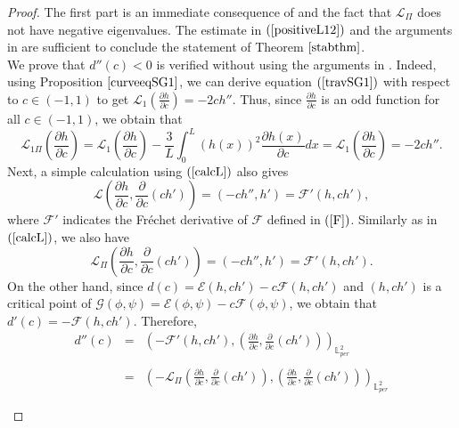 \documentclass[12pt,reqno,a4paper]{amsart} %
\numberwithin{equation}{section}
\numberwithin{figure}{section}
\begin{document}
\begin{proof} 
	
	
	The first part is an immediate consequence of \cite[page 278]{kato} and the fact that $\mathcal{L}_{\Pi}$ does not have negative eigenvalues. The estimate in $(\ref{positiveL12})$ and the arguments in \cite[Section 4]{Natali2015} are sufficient to conclude the statement of Theorem $\ref{stabthm}$.\\
	\indent  We prove that $d''(c)<0$ is verified without using the arguments in \cite[Subsection 4.2]{loreno}. Indeed, using Proposition $\ref{curveeqSG1}$, we can derive equation $(\ref{travSG1})$ with respect to $c\in(-1,1)$ to get $\mathcal{L}_1\left(\frac{\partial h}{\partial c}\right)=-2ch''$. Thus, since $\frac{\partial h}{\partial c}$ is an odd function for all $c\in(-1,1)$, we obtain that 
\begin{equation}\label{calcL}\mathcal{L}_{1\Pi}\left(\frac{\partial h}{\partial c}\right)=\mathcal{L}_1\left(\frac{\partial h}{\partial c}\right)-\frac{3}{L}\int_0^L(h(x))^2\frac{\partial h(x)}{\partial c}dx=
\mathcal{L}_1\left(\frac{\partial h}{\partial c}\right)=-2ch''.
\end{equation}
\indent Next, a simple calculation using $(\ref{calcL})$ also gives
\begin{equation}\label{calcL1}
\mathcal{L}\left(\frac{\partial h}{\partial c},\frac{\partial}{\partial c}(ch')\right)
=(-ch'',h')=\mathcal{F}'(h,ch'),
\end{equation}
where $\mathcal{F}'$ indicates the Fr\'echet derivative of $\mathcal{F}$ defined in $(\ref{F})$. Similarly as in $(\ref{calcL})$, we also have 
\begin{equation}\label{calcL2}
\mathcal{L}_{\Pi}\left(\frac{\partial h}{\partial c},\frac{\partial}{\partial c}(ch')\right)
=(-ch'',h')=\mathcal{F}'(h,ch').
\end{equation}
\indent On the other hand, since $d(c)=\mathcal{E}(h,ch')-c\mathcal{F}(h,ch')$ and $(h,ch')$ is a critical point of $\mathcal{G}(\phi,\psi)=\mathcal{E}(\phi,\psi)-c\mathcal{F}(\phi,\psi)$, we obtain that $d'(c)=-\mathcal{F}(h,ch')$. Therefore,
\begin{equation}\label{calcL3}\begin{array}{lllll}
d''(c)&=&\displaystyle\left(-\mathcal{F}'(h,ch'),\left(\frac{\partial h}{\partial c},\frac{\partial}{\partial c}(ch')\right)\right)_{\mathbb{L}_{per}^2}\\\\
&=&\displaystyle\left(-\mathcal{L}_{\Pi}\left(\frac{\partial h}{\partial c},\frac{\partial}{\partial c}(ch')\right),\left(\frac{\partial h}{\partial c},\frac{\partial}{\partial c}(ch')\right)\right)_{\mathbb{L}_{per}^2}\\\\

\end{array}
\end{equation}
\end{proof}
\end{document}
